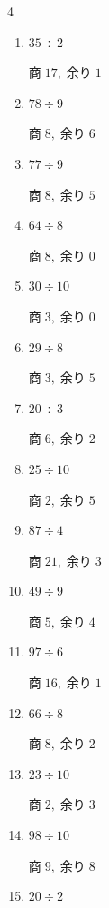 \begin{multicols}{4}
\begin{enumerate}
  \item $35 \div 2$

        $商\; 17,\; 余り\; 1$

  \item $78 \div 9$

        $商\; 8,\; 余り\; 6$

  \item $77 \div 9$

        $商\; 8,\; 余り\; 5$

\columnbreak %

\resetques

  \item $64 \div 8$

        $商\; 8,\; 余り\; 0$

  \item $30 \div 10$

        $商\; 3,\; 余り\; 0$

  \item $29 \div 8$

        $商\; 3,\; 余り\; 5$

  \item $20 \div 3$

        $商\; 6,\; 余り\; 2$

  \item $25 \div 10$

        $商\; 2,\; 余り\; 5$

  \item $87 \div 4$

        $商\; 21,\; 余り\; 3$

  \item $49 \div 9$

        $商\; 5,\; 余り\; 4$

  \item $97 \div 6$

        $商\; 16,\; 余り\; 1$

  \item $66 \div 8$

        $商\; 8,\; 余り\; 2$

  \item $23 \div 10$

        $商\; 2,\; 余り\; 3$

  \item $98 \div 10$

        $商\; 9,\; 余り\; 8$

  \item $20 \div 2$


\end{enumerate}
\end{multicols}
